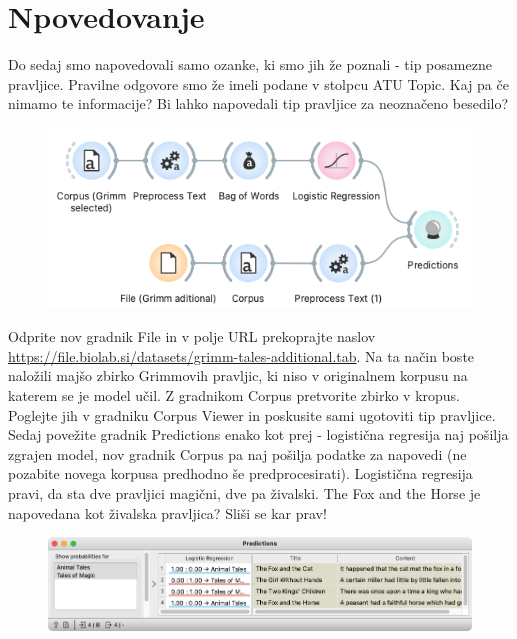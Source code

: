 \chapter{Npovedovanje}
\label{ch:text-napovedovanje}

Do sedaj smo napovedovali samo ozanke, ki smo jih že poznali - tip posamezne pravljice. Pravilne odgovore smo že imeli podane v stolpcu ATU Topic. Kaj pa če nimamo te informacije? Bi lahko napovedali tip pravljice za neoznačeno besedilo?

\begin{figure}[h]
    \includegraphics[width=\linewidth]{napovedovanje-workflow.png}%
    \caption{ }
    \label{fig:002-preprocess}
\end{figure}

Odprite nov gradnik File in v polje URL prekoprajte naslov \url{https://file.biolab.si/datasets/grimm-tales-additional.tab}. Na ta način boste naložili majšo zbirko Grimmovih pravljic, ki niso v originalnem korpusu na katerem se je model učil. Z gradnikom Corpus pretvorite zbirko v kropus. Poglejte jih v gradniku Corpus Viewer in poskusite sami ugotoviti tip pravljice.
Sedaj povežite gradnik Predictions enako kot prej - logistična regresija naj pošilja zgrajen model, nov gradnik Corpus pa naj pošilja podatke za napovedi (ne pozabite novega korpusa predhodno še predprocesirati). Logistična regresija pravi, da sta dve pravljici magični, dve pa živalski.
The Fox and the Horse je napovedana kot živalska pravljica? Sliši se kar prav!

\begin{figure}[h]
    \centering
    \includegraphics[width=\linewidth]{napovedovanje-predictions.png}%
    \caption{}
    \label{fig:002-word-cloud}
\end{figure}